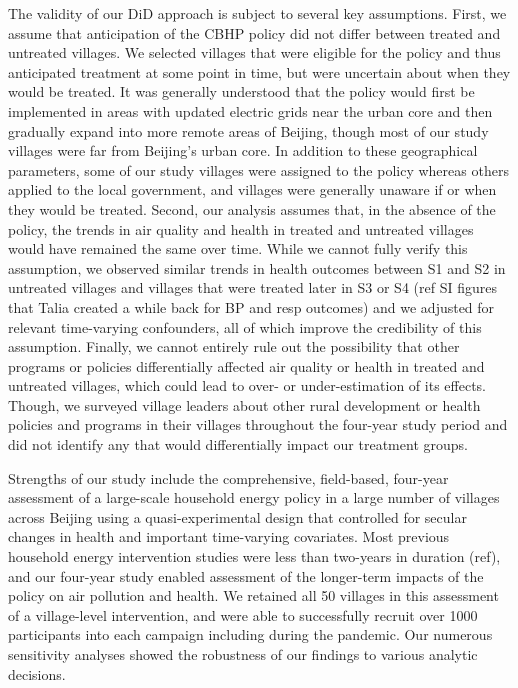 \documentclass[
  letterpaper,
  DIV=11,
  numbers=noendperiod]{scrartcl}
\begin{document}
The validity of our DiD approach is subject to several key assumptions.
First, we assume that anticipation of the CBHP policy did not differ
between treated and untreated villages. We selected villages that were
eligible for the policy and thus anticipated treatment at some point in
time, but were uncertain about when they would be treated. It was
generally understood that the policy would first be implemented in areas
with updated electric grids near the urban core and then gradually
expand into more remote areas of Beijing, though most of our study
villages were far from Beijing's urban core. In addition to these
geographical parameters, some of our study villages were assigned to the
policy whereas others applied to the local government, and villages were
generally unaware if or when they would be treated. Second, our analysis
assumes that, in the absence of the policy, the trends in air quality
and health in treated and untreated villages would have remained the
same over time. While we cannot fully verify this assumption, we
observed similar trends in health outcomes between S1 and S2 in
untreated villages and villages that were treated later in S3 or S4 (ref
SI figures that Talia created a while back for BP and resp outcomes) and
we adjusted for relevant time-varying confounders, all of which improve
the credibility of this assumption. Finally, we cannot entirely rule out
the possibility that other programs or policies differentially affected
air quality or health in treated and untreated villages, which could
lead to over- or under-estimation of its effects. Though, we surveyed
village leaders about other rural development or health policies and
programs in their villages throughout the four-year study period and did
not identify any that would differentially impact our treatment groups.

Strengths of our study include the comprehensive, field-based, four-year
assessment of a large-scale household energy policy in a large number of
villages across Beijing using a quasi-experimental design that
controlled for secular changes in health and important time-varying
covariates. Most previous household energy intervention studies were
less than two-years in duration (ref), and our four-year study enabled
assessment of the longer-term impacts of the policy on air pollution and
health. We retained all 50 villages in this assessment of a
village-level intervention, and were able to successfully recruit over
1000 participants into each campaign including during the pandemic. Our
numerous sensitivity analyses showed the robustness of our findings to
various analytic decisions.
\end{document}
